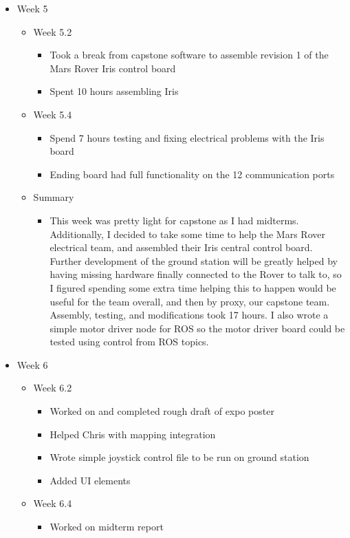 \begin{itemize}
\item Week 5
	\begin{itemize}
	\item Week 5.2
      \begin{itemize}
      \item Took a break from capstone software to assemble revision 1 of the Mars Rover Iris control board 
      \item Spent 10 hours assembling Iris 
      \end{itemize}
	\item Week 5.4
      \begin{itemize}
      \item Spend 7 hours testing and fixing electrical problems with the Iris board 
      \item Ending board had full functionality on the 12 communication ports 
      \end{itemize}
    
    \item Summary
      \begin{itemize}
      \item This week was pretty light for capstone as I had midterms. Additionally, I decided to take some time to help the Mars Rover electrical team, and assembled their Iris central control board. Further development of the ground station will be greatly helped by having missing hardware finally connected to the Rover to talk to, so I figured spending some extra time helping this to happen would be useful for the team overall, and then by proxy, our capstone team. Assembly, testing, and modifications took 17 hours. I also wrote a simple motor driver node for ROS so the motor driver board could be tested using control from ROS topics. 
      \end{itemize}
	\end{itemize}

\item Week 6
	\begin{itemize}
	\item Week 6.2
      \begin{itemize}
      \item Worked on and completed rough draft of expo poster 
      \item Helped Chris with mapping integration 
      \item Wrote simple joystick control file to be run on ground station 
      \item Added UI elements 
      \end{itemize}
	\item Week 6.4
      \begin{itemize}
      \item Worked on midterm report 
      \end{itemize}
    

\end{itemize}
\end{itemize}
